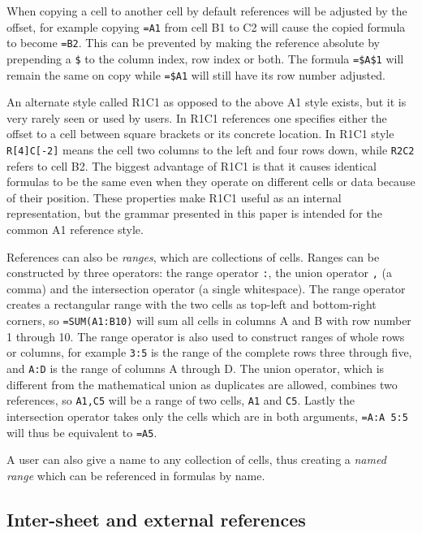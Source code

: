 \documentclass[12pt,a4paper,onecolumn,oneside]{memoir}
\begin{document}
When copying a cell to another cell by default references will be adjusted by the offset, for example copying \texttt{=A1} from cell B1 to C2 will cause the copied formula to become \texttt{=B2}.
This can be prevented by making the reference absolute by prepending a \texttt{\$} to the column index, row index or both.
The formula \texttt{=\$A\$1} will remain the same on copy while \texttt{=\$A1} will still have its row number adjusted.

An alternate style called R1C1 as opposed to the above A1 style exists, but it is very rarely seen or used by users.
In R1C1 references one specifies either the offset to a cell between square brackets or its concrete location.
In R1C1 style \texttt{R[4]C[-2]} means the cell two columns to the left and four rows down, while \texttt{R2C2} refers to cell B2.
The biggest advantage of R1C1 is that it causes identical formulas to be the same even when they operate on different cells or data because of their position.
These properties make R1C1 useful as an internal representation, but the grammar presented in this paper is intended for the common A1 reference style.

References can also be \emph{ranges}, which are collections of cells.
Ranges can be constructed by three operators: the range operator \texttt{:}, the union operator \texttt{,} (a comma) and the intersection operator \texttt{} (a single whitespace).
The range operator creates a rectangular range with the two cells as top-left and bottom-right corners, so \texttt{=SUM(A1:B10)} will sum all cells in columns A and B with row number 1 through 10.
The range operator is also used to construct ranges of whole rows or columns, for example \texttt{3:5} is the range of the complete rows three through five, and \texttt{A:D} is the range of columns A through D.
The union operator, which is different from the mathematical union as duplicates are allowed, combines two references, so \texttt{A1,C5} will be a range of two cells, \texttt{A1} and \texttt{C5}.
Lastly the intersection operator takes only the cells which are in both arguments, \texttt{=A:A 5:5} will thus be equivalent to \texttt{=A5}.

A user can also give a name to any collection of cells, thus creating a \emph{named range} which can be referenced in formulas by name.

\subsection{Inter-sheet and external references}
\label{subsection:ExternalRefsDDE}
\end{document}

